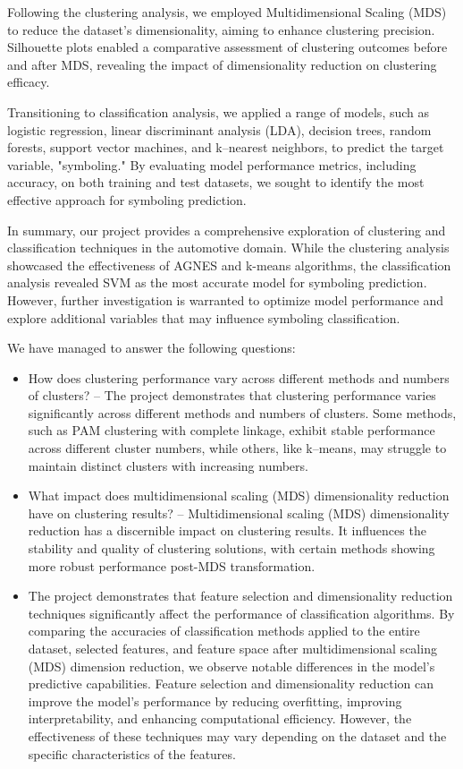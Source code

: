 \documentclass[11pt,a4paper]{article}\usepackage[]{graphicx}\usepackage[]{xcolor}
\begin{document}
Following the clustering analysis, we employed Multidimensional Scaling (MDS) to reduce the dataset's dimensionality, aiming to enhance clustering precision. Silhouette plots enabled a comparative assessment of clustering outcomes before and after MDS, revealing the impact of dimensionality reduction on clustering efficacy.

Transitioning to classification analysis, we applied a range of models, such as logistic regression, linear discriminant analysis (LDA), decision trees, random forests, support vector machines, and k--nearest neighbors, to predict the target variable, "symboling." By evaluating model performance metrics, including accuracy, on both training and test datasets, we sought to identify the most effective approach for symboling prediction.

In summary, our project provides a comprehensive exploration of clustering and classification techniques in the automotive domain. While the clustering analysis showcased the effectiveness of AGNES and k-means algorithms, the classification analysis revealed SVM as the most accurate model for symboling prediction. However, further investigation is warranted to optimize model performance and explore additional variables that may influence symboling classification. 
	
We have managed to answer the following questions:
\begin{itemize}
\item How does clustering performance vary across different methods and numbers of clusters? -- The project demonstrates that clustering performance varies significantly across different methods and numbers of clusters. Some methods, such as PAM clustering with complete linkage, exhibit stable performance across different cluster numbers, while others, like k--means, may struggle to maintain distinct clusters with increasing numbers.
\item What impact does multidimensional scaling (MDS) dimensionality reduction have on clustering results? -- Multidimensional scaling (MDS) dimensionality reduction has a discernible impact on clustering results. It influences the stability and quality of clustering solutions, with certain methods showing more robust performance post-MDS transformation.
\item The project demonstrates that feature selection and dimensionality reduction techniques significantly affect the performance of classification algorithms. By comparing the accuracies of classification methods applied to the entire dataset, selected features, and feature space after multidimensional scaling (MDS) dimension reduction, we observe notable differences in the model's predictive capabilities. Feature selection and dimensionality reduction can improve the model's performance by reducing overfitting, improving interpretability, and enhancing computational efficiency. However, the effectiveness of these techniques may vary depending on the dataset and the specific characteristics of the features.
\end{itemize}
\end{document}
